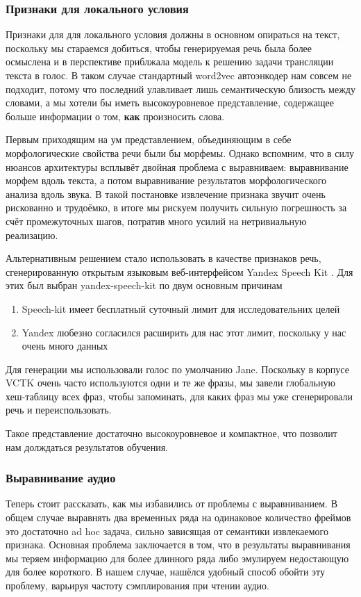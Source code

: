 \documentclass[../diploma.tex]{subfiles}
\begin{document}
\subsubsection{Признаки для локального условия}
Признаки для для локального условия должны в основном опираться на текст, поскольку мы стараемся добиться, чтобы генерируемая речь была более осмыслена и в перспективе приблжала модель к решению задачи трансляции текста в голос.
В таком случае стандартный word2vec автоэнкодер нам совсем не подходит, потому что последний улавливает лишь семантическую близость между словами, а мы хотели бы иметь высокоуровневое представление, содержащее больше информации о том, \textbf{как} произносить слова.

Первым приходящим на ум представлением, объединяющим в себе морфологические свойства речи были бы морфемы.
Однако вспомним, что в силу нюансов архитектуры всплывёт двойная проблема с выравниваем: выравнивание морфем вдоль текста, а потом выравнивание результатов морфологического анализа вдоль звука. 
В такой постановке извлечение признака звучит очень рискованно и трудоёмко, в итоге мы рискуем получить сильную погрешность за счёт промежуточных шагов, потратив много усилий на нетривиальную реализацию.

Альтернативным решением стало использовать в качестве признаков речь, сгенерированную открытым языковым веб-интерфейсом Yandex Speech Kit \cite{online:speech_kit}.
Для этих был выбран yandex-speech-kit по двум основным причинам
\begin{enumerate}
    \item Speech-kit имеет бесплатный суточный лимит для исследовательних целей
    \item Yandex любезно согласился расширить для нас этот лимит, поскольку у нас очень много данных 
\end{enumerate}
Для генерации мы использовали голос по умолчанию Jane. Поскольку в корпусе VCTK очень часто используются одни и те же фразы, мы завели глобальную хеш-таблицу всех фраз, чтобы запоминать, для каких фраз мы уже сгенерировали речь и переиспользовать.

Такое представление достаточно высокоуровневое и компактное, что позволит нам долждаться результатов обучения.

\subsubsection{Выравнивание аудио}
Теперь стоит рассказать, как мы избавились от проблемы с выравниванием.
В общем случае выравнять два временных ряда на одинаковое количество фреймов это достаточно ad hoc задача, сильно зависящая от семантики извлекаемого признака. Основная проблема заключается в том, что в результаты выравнивания мы теряем информацию для более длинного ряда либо эмулируем недостающую для более короткого. В нашем случае, нашёлся удобный способ обойти эту проблему, варьируя частоту сэмплирования при чтении аудио.
\end{document}
